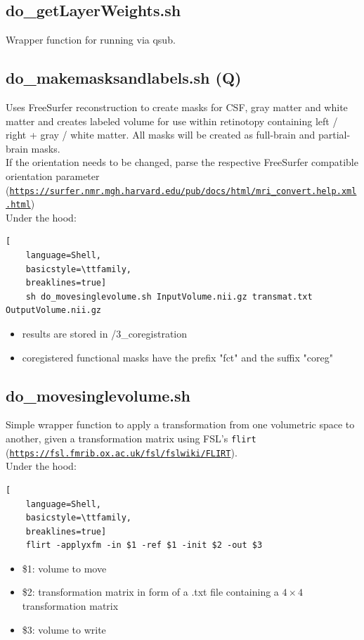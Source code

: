 \documentclass[12pt,a4paper]{scrartcl}
\begin{document}
\subsection{do\_getLayerWeights.sh}
\label{sh:getLyrW}
Wrapper function for running \texttt{} via qsub.\\

\subsection{do\_makemasksandlabels.sh (Q)}
\label{sh:msklbl}
Uses FreeSurfer reconstruction to create masks for CSF, gray matter and white matter and creates labeled volume for use within retinotopy containing left / right + gray / white matter. All masks will be created as full-brain and partial-brain masks.\\

\noindent If the orientation needs to be changed, parse the respective FreeSurfer compatible orientation parameter (\href{https://surfer.nmr.mgh.harvard.edu/pub/docs/html/mri_convert.help.xml.html}{\nolinkurl{https://surfer.nmr.mgh.harvard.edu/pub/docs/html/mri\_convert.help.xml.html}})\\

\noindent Under the hood:
\begin{lstlisting}[
    language=Shell,
    basicstyle=\ttfamily,
    breaklines=true]
    sh do_movesinglevolume.sh InputVolume.nii.gz transmat.txt OutputVolume.nii.gz
\end{lstlisting}
\begin{itemize}
\item results are stored in /3\_coregistration
\item coregistered functional masks have the prefix "fct" and the suffix "coreg"
\end{itemize}

\subsection{do\_movesinglevolume.sh}
\label{sh:move}
Simple wrapper function to apply a transformation from one volumetric space to another, given a transformation matrix using FSL's \texttt{flirt} (\href{https://fsl.fmrib.ox.ac.uk/fsl/fslwiki/FLIRT}{\nolinkurl{https://fsl.fmrib.ox.ac.uk/fsl/fslwiki/FLIRT}}).\\

\noindent Under the hood:
\begin{lstlisting}[
    language=Shell,
    basicstyle=\ttfamily,
    breaklines=true]
    flirt -applyxfm -in $1 -ref $1 -init $2 -out $3
\end{lstlisting}
\begin{itemize}
\item \$1: volume to move
\item \$2: transformation matrix in form of a .txt file containing a $4\times4$ transformation matrix
\item \$3: volume to write
\end{itemize}
\end{document}

